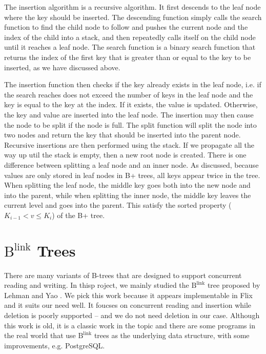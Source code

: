 \documentclass[11pt]{report}
\theoremstyle{definition}
\begin{document}
The insertion algorithm is a recursive algorithm. It first descends to the leaf node where the key should be inserted. The descending function simply calls the search function to find the child node to follow and pushes the current node and the index of the child into a stack, and then repeatedly calls itself on the child node until it reaches a leaf node. The search function is a binary search function that returns the index of the first key that is greater than or equal to the key to be inserted, as we have discussed above.

The insertion function then checks if the key already exists in the leaf node, i.e. if the search reaches does not exceed the number of keys in the leaf node and the key is equal to the key at the index. If it exists, the value is updated. Otherwise, the key and value are inserted into the leaf node. The insertion may then cause the node to be split if the node is full. The split function will split the node into two nodes and return the key that should be inserted into the parent node. Recursive insertions are then performed using the stack. If we propagate all the way up util the stack is empty, then a new root node is created. There is one difference between splitting a leaf node and an inner node. As discussed, because values are only stored in leaf nodes in B+ trees, all keys appear twice in the tree. When splitting the leaf node, the middle key goes both into the new node and into the parent, while when splitting the inner node, the middle key leaves the current level and goes into the parent. This satisfy the sorted property ($K_{i-1} < v \leq K_i$) of the B+ tree.

\section{$\text{B}^{\text{link}}$ Trees}

There are many variants of B-trees that are designed to support concurrent reading and writing. In thisp roject, we mainly studied the $\text{B}^{\text{link}}$ tree proposed by Lehman and Yao \cite{10.1145/319628.319663}. We pick this work because it appears implementable in Flix and it suits our need well. It foucses on concurrent reading and insertion while deletion is poorly supported -- and we do not need deletion in our case. Although this work is old, it is a classic work in the topic and there are some programs in the real world that use $\text{B}^{\text{link}}$ trees as the underlying data structure, with some improvements, e.g. PostgreSQL.
\end{document}
